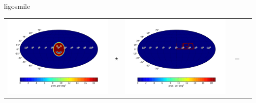 \documentclass[portrait]{a0poster}
\begin{document}
\begin{staticcontents*}{ligosmile}
\begin{tabular}{ccccc}
\begin{minipage}[c]{0.3\textwidth}
\includegraphics[width=\textwidth]{smile}
\end{minipage} &
{\Huge$\star$} &
\begin{minipage}[c]{0.3\textwidth}
\includegraphics[width=\textwidth]{ligo}
\end{minipage} &
{\Huge$=$} &
\begin{minipage}[c]{0.3\textwidth}

\end{minipage}
\end{tabular}
\end{staticcontents*}
\end{document}

